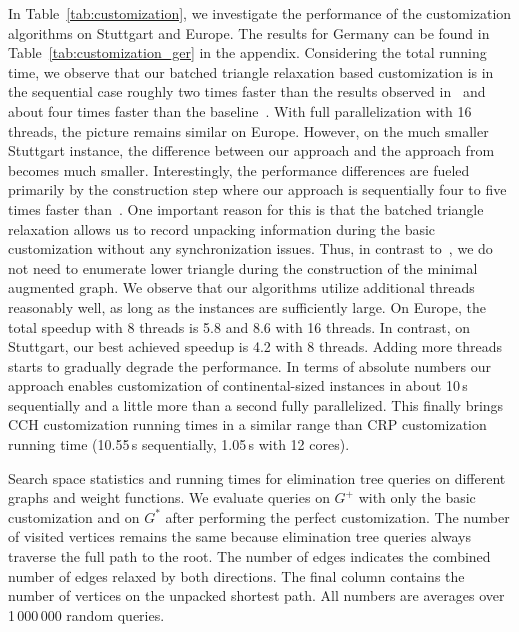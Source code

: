 \documentclass[a4paper, english, cleveref]{lipics-v2021}
\begin{document}
In Table~\ref{tab:customization}, we investigate the performance of the customization algorithms on Stuttgart and Europe.
The results for Germany can be found in Table~\ref{tab:customization_ger} in the appendix.
Considering the total running time, we observe that our batched triangle relaxation based customization is in the sequential case roughly two times faster than the results observed in~\cite{BuchholdSW19} and about four times faster than the baseline~\cite{DibbeltSW16}.
With full parallelization with 16 threads, the picture remains similar on Europe.
However, on the much smaller Stuttgart instance, the difference between our approach and the approach from~\cite{BuchholdSW19} becomes much smaller.
Interestingly, the performance differences are fueled primarily by the construction step where our approach is sequentially four to five times faster than~\cite{BuchholdSW19}.
One important reason for this is that the batched triangle relaxation allows us to record unpacking information during the basic customization without any synchronization issues.
Thus, in contrast to~\cite{BuchholdSW19}, we do not need to enumerate lower triangle during the construction of the minimal augmented graph.
We observe that our algorithms utilize additional threads reasonably well, as long as the instances are sufficiently large.
On Europe, the total speedup with 8 threads is 5.8 and 8.6 with 16 threads.
In contrast, on Stuttgart, our best achieved speedup is 4.2 with 8 threads.
Adding more threads starts to gradually degrade the performance.
In terms of absolute numbers our approach enables customization of continental-sized instances in about 10\,s sequentially and a little more than a second fully parallelized.
This finally brings CCH customization running times in a similar range than CRP customization running time (10.55\,s sequentially, 1.05\,s with 12 cores).

\begin{table}
\centering
\setlength{\tabcolsep}{4pt}
\caption{
Search space statistics and running times for elimination tree queries on different graphs and weight functions.
We evaluate queries on $G^+$ with only the basic customization and on $G^*$ after performing the perfect customization.
The number of visited vertices remains the same because elimination tree queries always traverse the full path to the root.
The number of edges indicates the combined number of edges relaxed by both directions.
The final column contains the number of vertices on the unpacked shortest path.
All numbers are averages over 1\,000\,000 random queries.
}\label{tab:queries}

\end{table}
\end{document}
